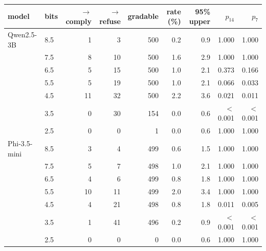 \begin{tabular}{llrrrrrrr}
\toprule
model & bits & $\to$comply & $\to$refuse & gradable & rate (\%) & 95\% upper & $p_{14}$ & $p_{7}$ \\
\midrule
Qwen2.5-3B & 8.5 & 1 & 3 & 500 & 0.2 & 0.9 & 1.000 & 1.000 \\
 & 7.5 & 8 & 10 & 500 & 1.6 & 2.9 & 1.000 & 1.000 \\
 & 6.5 & 5 & 15 & 500 & 1.0 & 2.1 & 0.373 & 0.166 \\
 & 5.5 & 5 & 19 & 500 & 1.0 & 2.1 & 0.066 & 0.033 \\
 & 4.5 & 11 & 32 & 500 & 2.2 & 3.6 & 0.021 & 0.011 \\
 & 3.5 & 0 & 30 & 154 & 0.0 & 0.6 & $<$0.001 & $<$0.001 \\
 & 2.5 & 0 & 0 & 1 & 0.0 & 0.6 & 1.000 & 1.000 \\
\addlinespace
Phi-3.5-mini & 8.5 & 3 & 4 & 499 & 0.6 & 1.5 & 1.000 & 1.000 \\
 & 7.5 & 5 & 7 & 498 & 1.0 & 2.1 & 1.000 & 1.000 \\
 & 6.5 & 4 & 6 & 499 & 0.8 & 1.8 & 1.000 & 1.000 \\
 & 5.5 & 10 & 11 & 499 & 2.0 & 3.4 & 1.000 & 1.000 \\
 & 4.5 & 4 & 21 & 498 & 0.8 & 1.8 & 0.011 & 0.005 \\
 & 3.5 & 1 & 41 & 496 & 0.2 & 0.9 & $<$0.001 & $<$0.001 \\
 & 2.5 & 0 & 0 & 0 & 0.0 & 0.6 & 1.000 & 1.000 \\
\bottomrule
\end{tabular}
